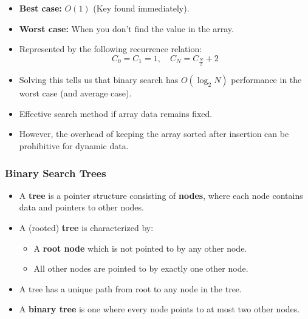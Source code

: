 \documentclass[a4paper,12pt]{article}
\begin{document}
\begin{itemize}
    \item \textbf{Best case:} \(O(1)\) (Key found immediately).
    \item \textbf{Worst case:} When you don’t find the value in the array.
    \item Represented by the following recurrence relation:
    \[
    C_0 = C_1 = 1, \quad C_N = C_{\frac{N}{2}} + 2
    \]
    \item Solving this tells us that binary search has \(O(\log_2 N)\) performance in the worst case (and average case).
    \item Effective search method if array data remains fixed.
    \item However, the overhead of keeping the array sorted after insertion can be prohibitive for dynamic data.
\end{itemize}

\subsubsection{Binary Search Trees}

\begin{itemize}
    \item A \textbf{tree} is a pointer structure consisting of \textbf{nodes}, where each node contains data and pointers to other nodes.
    \item A (rooted) \textbf{tree} is characterized by:
    \begin{itemize}
        \item A \textbf{root node} which is not pointed to by any other node.
        \item All other nodes are pointed to by exactly one other node.
    \end{itemize}
    \item A tree has a unique path from root to any node in the tree.
    \item A \textbf{binary tree} is one where every node points to at most two other nodes.
\end{itemize}
\end{document}
